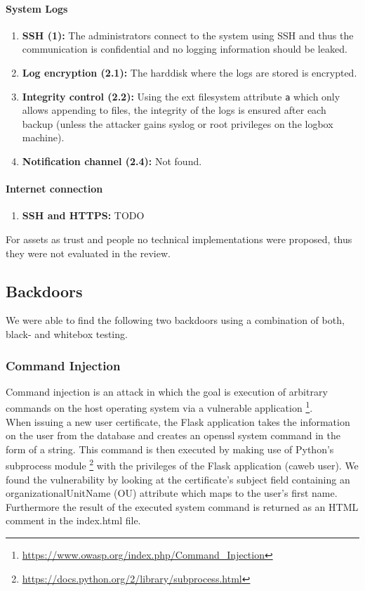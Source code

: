 \documentclass[english]{article}
\begin{document}
\paragraph{System Logs} 
\begin{enumerate}[label=(\alph*)]
	\item \textbf{SSH (1):} The administrators connect to the system using SSH and thus the communication is confidential and no logging information should be leaked.
	\item \textbf{Log encryption (2.1):} The harddisk where the logs are stored is encrypted.
	\item \textbf{Integrity control (2.2):} Using the ext filesystem attribute \texttt{a} which only allows appending to files, the integrity of the logs is ensured after each backup (unless the attacker gains syslog or root privileges on the logbox machine).
	\item \textbf{Notification channel (2.4):} Not found.
\end{enumerate}

\paragraph{Internet connection} 
\begin{enumerate}[label=(\alph*)]
	\item \textbf{SSH and HTTPS:} TODO
\end{enumerate}

For assets as trust and people no technical implementations were proposed, thus they were not evaluated in the review.


\subsection{Backdoors}

We were able to find the following two backdoors using a combination of both, black- and whitebox testing.

\subsubsection{Command Injection}
Command injection is an attack in which the goal is execution of arbitrary commands on the host operating system via a vulnerable application \footnote{\url{https://www.owasp.org/index.php/Command_Injection}}.\\
 When issuing a new user certificate, the Flask application takes the information on the user from the database and creates an openssl system command in the form of a string. This command is then executed by making use of Python's subprocess module \footnote{\url{https://docs.python.org/2/library/subprocess.html}} with the privileges of the Flask application (caweb user). 
 We found the vulnerability by looking at the certificate's subject field containing an organizationalUnitName (OU) attribute which maps to the user's first name. Furthermore the result of the executed system command is returned as an HTML comment in the index.html file.
 
\end{document}
